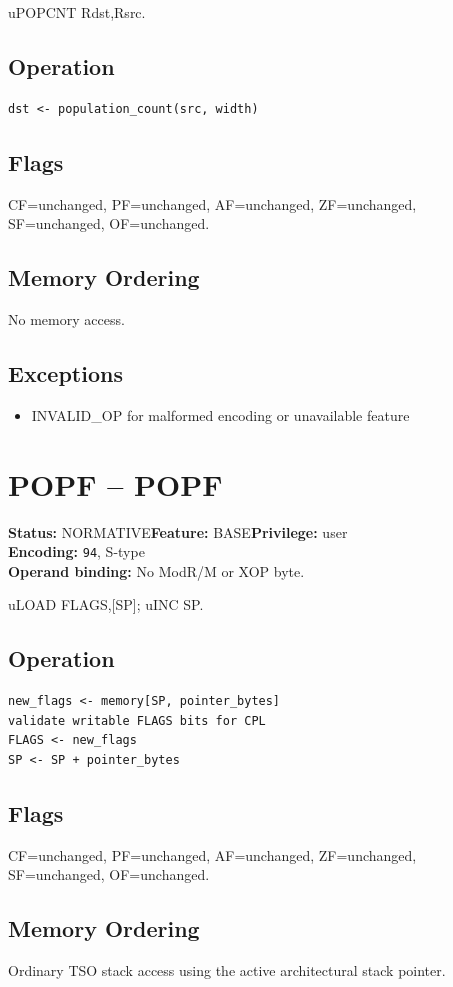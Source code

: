 \documentclass[10pt]{article}
\begin{document}
uPOPCNT Rdst,Rsrc.

\subsection*{Operation}
\begin{lstlisting}
dst <- population_count(src, width)
\end{lstlisting}
\subsection*{Flags}
CF=unchanged, PF=unchanged, AF=unchanged, ZF=unchanged, SF=unchanged, OF=unchanged.
\subsection*{Memory Ordering}
No memory access.
\subsection*{Exceptions}
\begin{itemize}
\item INVALID\_OP for malformed encoding or unavailable feature
\end{itemize}
\clearpage

\section{POPF -- POPF}
\textbf{Status:} NORMATIVE\quad \textbf{Feature:} BASE\quad \textbf{Privilege:} user\\
\textbf{Encoding:} \texttt{94}, S-type\\
\textbf{Operand binding:} No ModR/M or XOP byte.

uLOAD FLAGS,[SP]; uINC SP.

\subsection*{Operation}
\begin{lstlisting}
new_flags <- memory[SP, pointer_bytes]
validate writable FLAGS bits for CPL
FLAGS <- new_flags
SP <- SP + pointer_bytes
\end{lstlisting}
\subsection*{Flags}
CF=unchanged, PF=unchanged, AF=unchanged, ZF=unchanged, SF=unchanged, OF=unchanged.
\subsection*{Memory Ordering}
Ordinary TSO stack access using the active architectural stack pointer.
\end{document}
